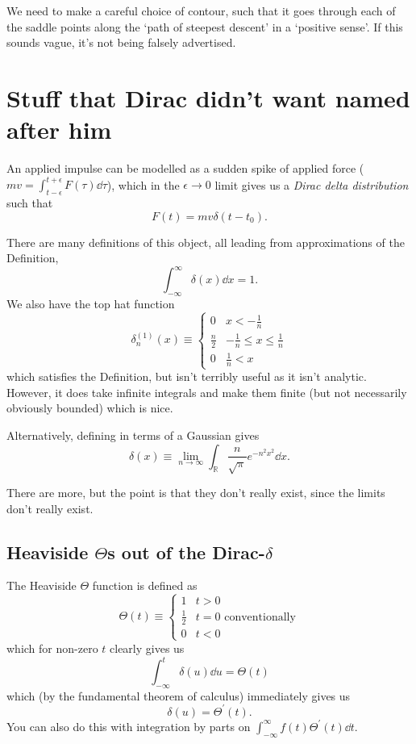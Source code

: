 \documentclass[a4paper,12pt,parskip=full,BCOR=1cm]{scrreprt}
\renewcommand{\leq}{\leqslant}
\begin{document}
We need to make a careful choice of contour, such that it goes through each of the saddle points along the `path of steepest descent' in a `positive sense'.
If this sounds vague, it's not being falsely advertised.

\chapter{Stuff that Dirac didn't want named after him}
An applied impulse can be modelled as a sudden spike of applied force ($mv = \int_{t-\epsilon}^{t+\epsilon}F(\tau)\dd{\tau}$), which in the $\epsilon\rightarrow 0$ limit gives us a \emph{Dirac delta distribution} such that $$ F(t) = mv\delta(t-t_0).$$

There are many definitions of this object, all leading from approximations of the Definition, $$ \int_{-\infty}^{\infty} \delta(x) \dd{x} = 1 .$$
We also have the top hat function
\begin{equation*}
 \delta_n^{(1)} (x) \equiv \begin{cases}
  0           & x<-\frac{1}{n}                       \\
  \frac{n}{2} & -\frac{1}{n} \leq x \leq \frac{1}{n} \\
  0           & \frac{1}{n} < x
 \end{cases}
\end{equation*}
which satisfies the Definition,  but isn't terribly useful as it isn't analytic.
However, it does take infinite integrals and make them finite (but not necessarily obviously bounded) which is nice.

Alternatively, defining in terms of a Gaussian gives
$$\delta(x) \equiv \lim_{n\rightarrow\infty}\int_\mathbb{R} \frac{n}{\sqrt{\pi}}e^{-n^2x^2}\dd{x}.$$

There are more, but the point is that they don't really exist, since the limits don't really exist.

\section[Heaviside Thetas out of the Dirac delta]{Heaviside $\Theta$s out of the Dirac-$\delta$}
The Heaviside $\Theta$ function is defined as
\begin{equation*}
 \Theta(t) \equiv \begin{cases}
  1           & t>0                          \\
  \frac{1}{2} & t = 0 \text{ conventionally} \\
  0           & t<0
 \end{cases}
\end{equation*}
which for non-zero $t$ clearly gives us
$$\int_{-\infty}^t \delta(u)\dd{u} = \Theta(t)$$ which (by the fundamental theorem of calculus) immediately gives us $$ \delta(u) = \Theta^\prime (t).$$ You can also do this with integration by parts on $\int_{-\infty}^{\infty}f(t)\Theta^\prime(t)\dd{t}$.
\end{document}
